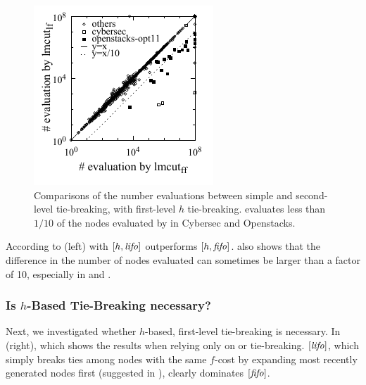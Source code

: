 \begin{figure}[tb]
 \centering {}
 \includegraphics{tables/aaai16-30min-5min-cut/aaai16prelim3/evaluated-lmcut_ff-lmcut_lf.pdf}
 \caption{Comparisons of the number evaluations between simple \lifo and
 \fifo second-level tie-breaking, with first-level $h$
 tie-breaking. \lifo evaluates less than $1/10$ of the nodes evaluated
 by \fifo in Cybersec and Openstacks.}
 \label{f-h-eval}
\end{figure}

According to  (left) with $[h,\mbox{\textit{lifo}}]$
outperforms $[h,\mbox{\textit{fifo}}]$.
 also shows that the difference in the number of nodes
evaluated can sometimes be larger than a factor of 10, especially in
 and .

\subsubsection{Is $h$-Based Tie-Breaking necessary?}

Next, we investigated whether $h$-based, first-level tie-breaking is necessary.
In  (right), which shows the results when  relying only on \fifo or \lifo tie-breaking.
$[\mbox{\textit{lifo}}]$, which simply breaks ties among nodes with the same $f$-cost by expanding most recently generated nodes first (suggested in \cite{korf1985depth}), clearly dominates $[\mbox{\textit{fifo}}]$.

